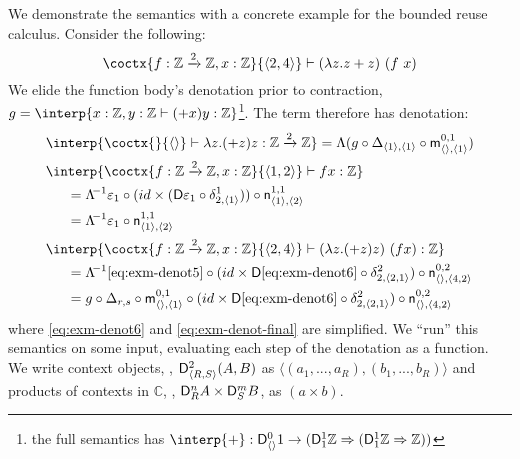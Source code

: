 \begin{example}
We demonstrate the semantics with a concrete example 
for the bounded reuse calculus.
Consider the following:
$$
\coctx{f:\mathbb{Z}\xrightarrow{2}\mathbb{Z}, x:\mathbb{Z}}{\langle 2, 4 \rangle } \vdash (\lambda z.z+z)~(f\ x)
$$
We elide the function body's denotation prior to contraction,
 $g = \interp{x : \mathbb{Z}, y : \mathbb{Z} \vdash (+x) y : \mathbb{Z}}$\footnote{
the full semantics has $\interp{+} : \D^0_{\langle{}\rangle} 1 \rightarrow (\D^1_1
\mathbb{Z} \Rightarrow (\D^1_1 \mathbb{Z} \Rightarrow \mathbb{Z}))$}. %
The term therefore has denotation: 
\begin{align}
\label{eq:exm-denot5}
& \interp{\coctx{}{\langle  \rangle} \vdash
\lambda z . (+ z) z : \mathbb{Z} \xrightarrow{2} \mathbb{Z}} = \Lambda (g \circ \Delta_{\langle{1}\rangle,\langle{1}\rangle} \circ \m^{0,1}_{\langle{}\rangle,\langle{1}\rangle}) \\
\notag & \interp{\coctx{f : \mathbb{Z} \xrightarrow{2} \mathbb{Z}, x : \mathbb{Z}}{\langle{1, 2}\rangle} \vdash 
f x : \mathbb{Z}} \\
\notag
& \hspace{1.5em} = \uncurry \varepsilon_1 \circ (id \times (\D \varepsilon_1 \circ \delta^1_{2, \langle{1}\rangle})) \circ \n^{1,1}_{\langle{1}\rangle,\langle{2}\rangle} \\ 
\label{eq:exm-denot6} 
& \hspace{1.5em} = \uncurry \varepsilon_1 \circ \n^{1,1}_{\langle{1}\rangle,\langle{2}\rangle} \\ 
\notag 
& \interp{\coctx{f : \mathbb{Z} \xrightarrow{2} \mathbb{Z},
x : \mathbb{Z}}{\langle{2, 4}\rangle}
\vdash 
(\lambda z . (+ z) z)\ (f x) : \mathbb{Z}} 
\\
\notag
& \hspace{1.5em} = \uncurry \eqref{eq:exm-denot5} \circ (id \times \D \eqref{eq:exm-denot6} 
\circ \delta^2_{2,\langle{2,1}\rangle}) 
\circ \n^{0,2}_{\langle{}\rangle,{\langle{4,2}\rangle}}
\\
\label{eq:exm-denot-final}
& \hspace{1.5em} = g \circ \Delta_{r,s} \circ \m^{0,1}_{\langle{}\rangle,\langle{1}\rangle} \circ (id \times \D \eqref{eq:exm-denot6} 
\circ \delta^2_{2,\langle{2,1}\rangle}) 
\circ \n^{0,2}_{\langle{}\rangle,{\langle{4,2}\rangle}}
\end{align}
where \eqref{eq:exm-denot6} and \eqref{eq:exm-denot-final} are simplified. 
We ``run'' this semantics on some input, evaluating each step of the denotation as a function. 
We write context objects, \eg{}, $\mathsf{D}^2_{\langle{R, S}\rangle} (A, B)$ as $\langle(a_1, ..., a_R), (b_1, ..., b_R)\rangle$ and products of
 contexts in $\mathbb{C}$, \eg{},  $\mathsf{D}^n_R A \times \mathsf{D}^m_S B$, as $(a \times b)$. 


\end{example}
